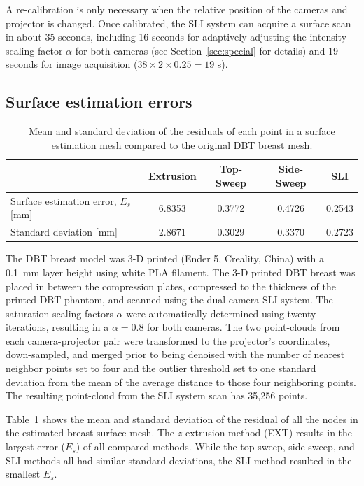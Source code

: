 A re-calibration is only necessary when the relative position of the cameras and projector is changed. Once calibrated, the \ac{SLI} system can acquire a surface scan in about 35 seconds, including 16 seconds for adaptively adjusting the intensity scaling factor $\alpha$ for both cameras (see Section~\ref{sec:special} for details) and 19 seconds for image acquisition ($38 \times 2\times 0.25 = 19$ s).

\subsection{Surface estimation errors}
\begin{table}
    \centering
    \caption{Mean and standard deviation of the residuals of each point in a surface estimation mesh compared to the original \ac{DBT} breast mesh.}
        \begin{tabular}{lcccc}
        \toprule
         & Extrusion & Top-Sweep & Side-Sweep & \ac{SLI} \\ \midrule
        Surface estimation error, $E_s$ [mm] & 6.8353 & 0.3772 & 0.4726 & \multicolumn{1}{l}{0.2543} \\
        Standard deviation [mm] & 2.8671 & 0.3029 & 0.3370 & 0.2723 \\ \bottomrule
        \end{tabular}%
    \label{tab:residuals}
\end{table}

The \ac{DBT} breast model was 3-D printed (Ender 5, Creality, China) with a 0.1~mm layer height using white \ac{PLA} filament. The 3-D printed \ac{DBT} breast was placed in between the compression plates, compressed to the thickness of the printed \ac{DBT} phantom, and scanned using the dual-camera \ac{SLI} system. The saturation scaling factors $\alpha$ were automatically determined using twenty iterations, resulting in a $\alpha=0.8$ for both cameras. The two point-clouds from each camera-projector pair were transformed to the projector's coordinates, down-sampled, and merged prior to being denoised with the number of nearest neighbor points set to four and the outlier threshold set to one standard deviation from the mean of the average distance to those four neighboring points. The resulting point-cloud from the \ac{SLI} system scan has 35,256 points.

Table~\ref{tab:residuals} shows the mean and standard deviation of the residual of all the nodes in the estimated breast surface mesh. The $z$-extrusion method (EXT) results in the largest error ($E_s$) of all compared methods. While the top-sweep, side-sweep, and \ac{SLI} methods all had similar standard deviations, the \ac{SLI} method resulted in the smallest $E_s$.

